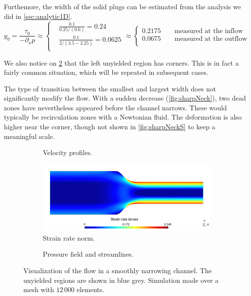\documentclass[11 pt]{report}
\begin{document}
Furthemore, the width of the solid plugs can be estimated from the analysis we did in \cref{sec:analytic1D}. 
\begin{equation}
    y_0 = \frac{\tau_0}{-\partial_x p} \approx 
    \begin{cases}
        &\frac{0.1}{0.25 / (0.6)} = 0.24\\
        &\frac{0.1}{2 /(3.5-2.25)} = 0.0625\\
    \end{cases}
    \approx
    \begin{cases}
        0.2175 \qquad \text{measured at the inflow}\\
        0.0675  \qquad \text{measured at the outflow}\\
    \end{cases}    
\end{equation}

We also notice on \cref{fig:smoothNeckS} that the left unyielded region has corners. This is in fact a fairly common situation, which will be repeated in subsequent cases.

The type of transition between the smallest and largest width does not significantly modify the flow. With a sudden decrease (\cref{fig:sharpNeck}), two dead zones have nevertheless appeared before the channel narrows. These would typically be recirculation zones with a Newtonian fluid. The deformation is also higher near the corner, though not shown in \cref{fig:sharpNeckS} to keep a meaningful scale. 

\begin{figure}
    \centering
    \begin{subfigure}[t]{\textwidth}
        
        \caption{Velocity profiles.}
        \label{fig:smoothNeckV}
    \end{subfigure}
    \begin{subfigure}[t]{\textwidth}
        \includegraphics[width=\textwidth]{../figures/neck_smooth_strain.pdf}
        \caption{Strain rate norm.}
        \label{fig:smoothNeckS}
    \end{subfigure}
    \begin{subfigure}[t]{\textwidth}
        
        \caption{Pressure field and streamlines.}
        \label{fig:smoothNeckP}
    \end{subfigure}
    \caption{Visualization of the flow in a smoothly narrowing channel. The unyielded regions are shown in blue grey. Simulation made over a mesh with $12\,000$ elements.}
    \label{fig:smoothNeck}
\end{figure}
\end{document}
